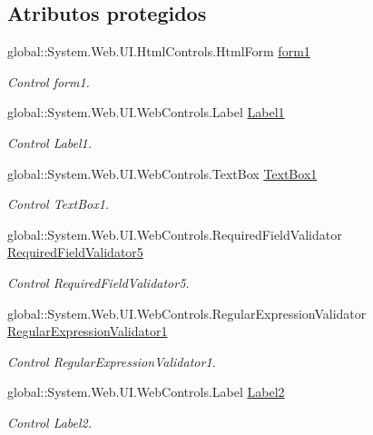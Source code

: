 \subsection*{Atributos protegidos}
\begin{DoxyCompactItemize}
\item 
global\+::\+System.\+Web.\+U\+I.\+Html\+Controls.\+Html\+Form \mbox{\hyperlink{classInicio_1_1Registro_a0b8d260039acc63632a758544652ea24}{form1}}
\begin{DoxyCompactList}\small\item\em Control form1. \end{DoxyCompactList}\item 
global\+::\+System.\+Web.\+U\+I.\+Web\+Controls.\+Label \mbox{\hyperlink{classInicio_1_1Registro_a4ec239a90d4abd7bfd75de6f88d318c9}{Label1}}
\begin{DoxyCompactList}\small\item\em Control Label1. \end{DoxyCompactList}\item 
global\+::\+System.\+Web.\+U\+I.\+Web\+Controls.\+Text\+Box \mbox{\hyperlink{classInicio_1_1Registro_ab767617adc8dcd13a78c70824d55eb24}{Text\+Box1}}
\begin{DoxyCompactList}\small\item\em Control Text\+Box1. \end{DoxyCompactList}\item 
global\+::\+System.\+Web.\+U\+I.\+Web\+Controls.\+Required\+Field\+Validator \mbox{\hyperlink{classInicio_1_1Registro_af4f83864caf67319997d2b41fb4298b2}{Required\+Field\+Validator5}}
\begin{DoxyCompactList}\small\item\em Control Required\+Field\+Validator5. \end{DoxyCompactList}\item 
global\+::\+System.\+Web.\+U\+I.\+Web\+Controls.\+Regular\+Expression\+Validator \mbox{\hyperlink{classInicio_1_1Registro_a1d327341db3c92117be1c5e828fe2bf9}{Regular\+Expression\+Validator1}}
\begin{DoxyCompactList}\small\item\em Control Regular\+Expression\+Validator1. \end{DoxyCompactList}\item 
global\+::\+System.\+Web.\+U\+I.\+Web\+Controls.\+Label \mbox{\hyperlink{classInicio_1_1Registro_ae7b4e658b3d377fe9acc4b4930616dae}{Label2}}
\begin{DoxyCompactList}\small\item\em Control Label2. \end{DoxyCompactList}\item 

\end{DoxyCompactItemize}
